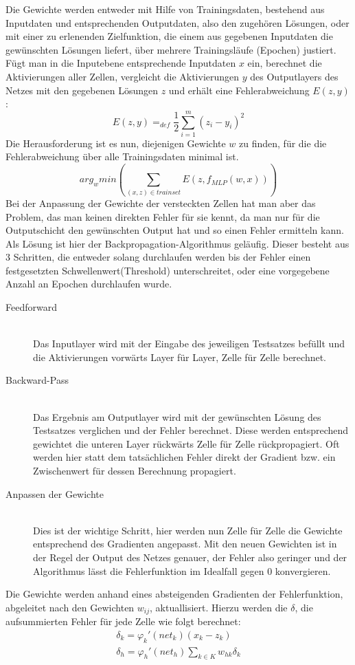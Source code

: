 Die Gewichte werden entweder mit Hilfe von Trainingsdaten, bestehend aus Inputdaten und entsprechenden Outputdaten, also den zugehören Lösungen, oder mit einer zu erlenenden Zielfunktion, die einem aus gegebenen Inputdaten die gewünschten Lösungen liefert, über mehrere Trainingsläufe (Epochen) justiert. Fügt man in die Inputebene entsprechende Inputdaten \(x\) ein, berechnet die Aktivierungen aller Zellen, vergleicht die Aktivierungen \(y\) des Outputlayers des Netzes mit den gegebenen Lösungen \(z\) und erhält eine Fehlerabweichung \( E(z,y)\): 
\begin{equation}
E(z,y) =_{def} \dfrac{1}{2} \sum_{i=1}^{m}(z_{i}-y_{i})^{2}
	\label{eq:err}
\end{equation}
Die Herausforderung ist es nun, diejenigen Gewichte \(w\) zu finden, für die die Fehlerabweichung über alle Trainingsdaten minimal ist.
\begin{equation}
arg_{w} min( \sum_{(x,z)\in trainset} E(z,f_{MLP}(w,x)))
\label{eq:err}
\end{equation}
Bei der Anpassung der Gewichte der versteckten Zellen hat man aber das Problem, das man keinen direkten Fehler für sie kennt, da man nur für die Outputschicht den gewünschten Output hat und so einen Fehler ermitteln kann. Als Lösung ist hier der Backpropagation-Algorithmus geläufig. Dieser besteht aus 3 Schritten, die entweder solang durchlaufen werden bis der Fehler einen festgesetzten Schwellenwert(Threshold) unterschreitet, oder eine vorgegebene Anzahl an Epochen durchlaufen wurde. 
\begin{description}	\item[Feedforward]\hfill \\
	Das Inputlayer wird mit der Eingabe des jeweiligen Testsatzes befüllt und die Aktivierungen vorwärts Layer für Layer, Zelle für Zelle berechnet.  
	\item[Backward-Pass]\hfill \\ 
	Das Ergebnis am Outputlayer wird mit der gewünschten Lösung des Testsatzes verglichen und der Fehler berechnet. Diese werden entsprechend gewichtet die unteren Layer rückwärts Zelle für Zelle rückpropagiert. Oft werden hier statt dem tatsächlichen Fehler direkt der Gradient bzw. ein Zwischenwert für dessen Berechnung propagiert.
	\item[Anpassen der Gewichte]\hfill \\ Dies ist der wichtige Schritt, hier werden nun Zelle für Zelle die Gewichte entsprechend des Gradienten angepasst. Mit den neuen Gewichten ist in der Regel der Output des Netzes genauer, der Fehler also geringer und der Algorithmus lässt die Fehlerfunktion im Idealfall gegen 0 konvergieren.\cite{bib:nn}
\end{description}
Die Gewichte werden anhand eines absteigenden Gradienten der Fehlerfunktion, abgeleitet nach den Gewichten \(w_{ij}\), aktuallisiert.  Hierzu werden die \(\delta\), die aufsummierten Fehler für jede Zelle wie folgt berechnet: 
\begin{gather}
\delta_{k} = \varphi_{k}'(net_{k})(x_{k}-z_{k}) \\
\delta_{h} = \varphi_{h}'(net_{h})\sum_{k\in K}w_{hk}\delta_{k} 
\label{eq:err}
\end{gather}

